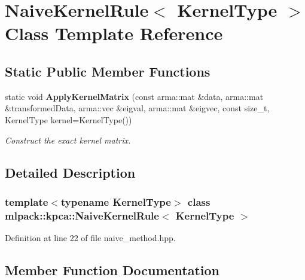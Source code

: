 \section{Naive\+Kernel\+Rule$<$ Kernel\+Type $>$ Class Template Reference}
\label{classmlpack_1_1kpca_1_1NaiveKernelRule}
\subsection*{Static Public Member Functions}
\begin{DoxyCompactItemize}
\item 
static void \textbf{ Apply\+Kernel\+Matrix} (const arma\+::mat \&data, arma\+::mat \&transformed\+Data, arma\+::vec \&eigval, arma\+::mat \&eigvec, const size\+\_\+t, Kernel\+Type kernel=Kernel\+Type())
\begin{DoxyCompactList}\small\item\em Construct the exact kernel matrix. \end{DoxyCompactList}\end{DoxyCompactItemize}


\subsection{Detailed Description}
\subsubsection*{template$<$typename Kernel\+Type$>$\newline
class mlpack\+::kpca\+::\+Naive\+Kernel\+Rule$<$ Kernel\+Type $>$}



Definition at line 22 of file naive\+\_\+method.\+hpp.



\subsection{Member Function Documentation}
\mbox{\label{classmlpack_1_1kpca_1_1NaiveKernelRule_a38b9096fb257a933f5681831c9654671}} 
